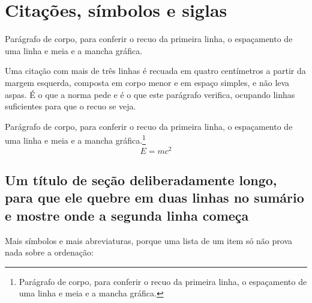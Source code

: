 \documentclass[dsc,pdfa,coorientador,dadoscoleta]{ufrj}
\begin{document}
  \chapter{Citações, símbolos e siglas}
  Parágrafo de corpo, para conferir o recuo da primeira linha, o espaçamento de uma linha e meia e a mancha gráfica. \citep{book-example}
  \begin{longquote}
  Uma citação com mais de três linhas é recuada em quatro centímetros a partir da margem esquerda, composta em corpo menor e em espaço simples, e não leva aspas. É o que a norma pede e é o que este parágrafo verifica, ocupando linhas suficientes para que o recuo se veja.
  \end{longquote}
  Parágrafo de corpo, para conferir o recuo da primeira linha, o espaçamento de uma linha e meia e a mancha gráfica.\footnote{Parágrafo de corpo, para conferir o recuo da primeira linha, o espaçamento de uma linha e meia e a mancha gráfica.}
  \begin{equation}
    E = mc^{2} \label{eq:adv}
  \end{equation}
    

  \section{Um título de seção deliberadamente longo, para que ele quebre
    em duas linhas no sumário e mostre onde a segunda linha começa}
  Mais símbolos e mais abreviaturas, porque uma lista de um item só não
  prova nada sobre a ordenação:
     
\end{document}
